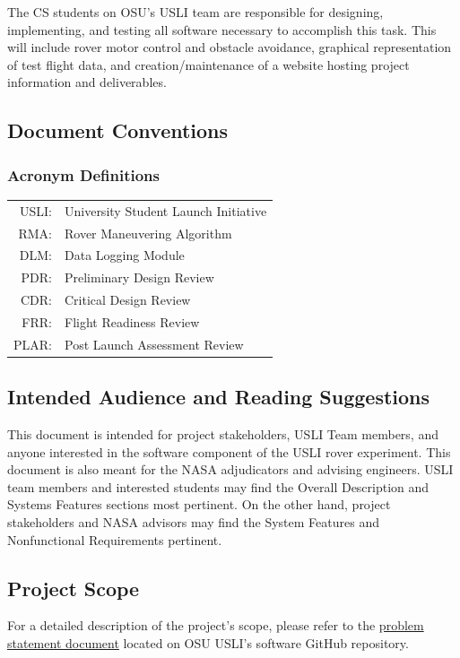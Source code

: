 \documentclass[onecolumn, draftclsnofoot, 10pt, compsoc]{IEEEtran}
\begin{document}
The CS students on OSU's USLI team are responsible for designing, implementing, and testing all software necessary to accomplish this task. 
This will include rover motor control and obstacle avoidance, graphical representation of test flight data, and creation/maintenance of a website hosting project information and deliverables.

\subsection{Document Conventions}
\subsubsection{Acronym Definitions}
\begin{tabular}{rl}
USLI: & University Student Launch Initiative\\
RMA: & Rover Maneuvering Algorithm \\
DLM: & Data Logging Module\\
PDR: & Preliminary Design Review\\
CDR: & Critical Design Review\\
FRR: & Flight Readiness Review\\
PLAR: & Post Launch Assessment Review\\
\end{tabular}

\subsection{Intended Audience and Reading Suggestions}
This document is intended for project stakeholders, USLI Team members, and anyone interested in the software component of the USLI rover experiment. This document is also meant for the NASA adjudicators and advising engineers. USLI team members and interested students may find the Overall Description and Systems Features sections most pertinent. On the other hand, project stakeholders and NASA advisors may find the System Features and Nonfunctional Requirements pertinent.

\subsection{Project Scope}
For a detailed description of the project's scope, please refer to the \href{https://github.com/OSU-USLI-18/Payload-Software/tree/master/capstone-documentation/33_problem_statement}{problem statement document} located on OSU USLI's software GitHub repository.
\end{document}
